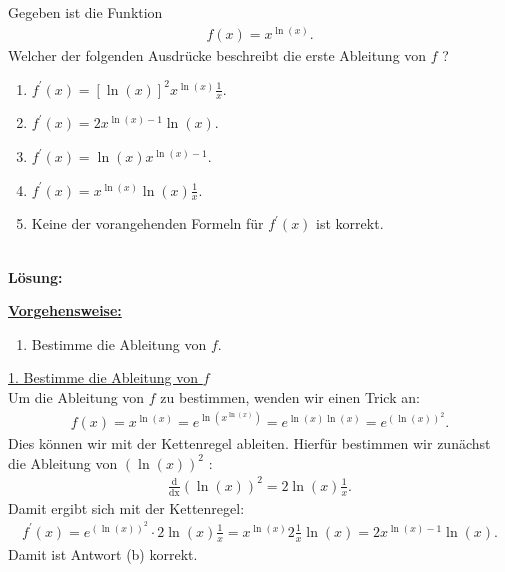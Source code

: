 \subsection*{}
Gegeben ist die Funktion
\begin{align*}
	f(x) = x^{\ln(x)}.
\end{align*}
Welcher der folgenden Ausdrücke beschreibt die erste Ableitung von $ f $ ?
\renewcommand{\labelenumi}{(\alph{enumi})}
\begin{enumerate}
	\item 
	$ f^\prime(x) = [\ln(x)]^2 x^{\ln(x)} \frac{1}{x}$.
	\item
	$ f^\prime(x) =2 x^{\ln(x) -1} \ln(x) $.
	\item
	$ f^\prime(x) = \ln(x) x^{\ln(x) -1} $.
	\item
	$ f^\prime(x) =  x^{\ln(x) }\ln(x)\frac{1}{x} $.
	\item
	Keine der vorangehenden Formeln für $ f^\prime(x)  $ ist korrekt.
\end{enumerate}
\ \\
\textbf{Lösung:}
\begin{mdframed}
\underline{\textbf{Vorgehensweise:}}
\renewcommand{\labelenumi}{\theenumi.}
\begin{enumerate}
\item Bestimme die Ableitung von $ f $.
\end{enumerate}
\end{mdframed}
\underline{1. Bestimme die Ableitung von $ f $}\\
Um die Ableitung von $ f $ zu bestimmen, wenden wir einen Trick an:
\begin{align*}
	f(x) = x^{\ln(x)} = e^{\ln(x^{\ln(x)})}
	=
	e^{\ln(x) \ln(x)}
	=
	e^{(\ln(x))^2}.
\end{align*}
Dies können wir mit der Kettenregel ableiten. Hierfür bestimmen wir zunächst die Ableitung von $ (\ln(x))^2 $ :
\begin{align*}
	\frac{\mathrm{d}}{\mathrm{dx}}
	(\ln(x))^2
	=
	2 \ln(x) \frac{1}{x}.
\end{align*}
Damit ergibt sich mit der Kettenregel:
\begin{align*}
	f^\prime(x)
	=
	e^{(\ln(x))^2} \cdot  2 \ln(x) \frac{1}{x}
	=
	 x^{\ln(x)} 2 \frac{1}{x} \ln(x)
	=
	2 x^{\ln(x) - 1} \ln(x).
\end{align*}
Damit ist Antwort (b) korrekt.
\newpage
